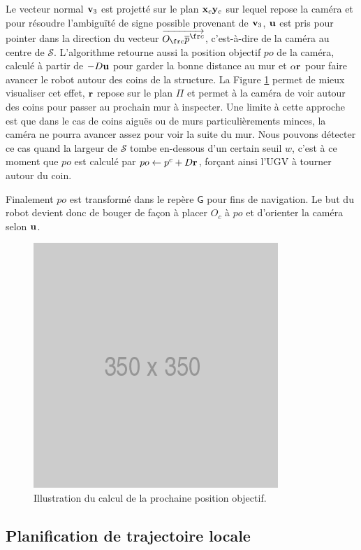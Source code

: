 Le vecteur normal $\mathbf{v}_3$ est projetté sur le plan $\mathbf{x}_c\mathbf{y}_c$ sur lequel repose la caméra et pour résoudre l'ambiguïté de signe possible provenant de $\mathbf{v}_3$, $\mathbf{u}$ est pris pour pointer dans la direction du vecteur $\overrightarrow{O_{\fr c} \overline{p}^{\fr c}}$, c'est-à-dire de la caméra au centre de $\mathcal{S}$. L'algorithme retourne aussi la position objectif ${po}$ de la caméra, calculé à partir de $-D\mathbf{u}$ pour garder la bonne distance au mur et $\alpha \mathbf{r}$ pour faire avancer le robot autour des coins de la structure. La Figure \ref{fig:ugv_goal_determination} permet de mieux visualiser cet effet, $\mathbf{r}$ repose sur le plan $\Pi$ et permet à la caméra de voir autour des coins pour passer au prochain mur à inspecter. Une limite à cette approche est que dans le cas de coins aiguës ou de murs particulièrements minces, la caméra ne pourra avancer assez pour voir la suite du mur. Nous pouvons détecter ce cas quand la largeur de $\mathcal{S}$ tombe en-dessous d'un certain seuil $w$, c'est à ce moment que ${po}$ est calculé par ${po} \gets p^c + D \mathbf{r}$, forçant ainsi l'UGV à tourner autour du coin.

Finalement ${po}$ est transformé dans le repère $\mathsf{G}$ pour fins de navigation. Le but du robot  devient donc de bouger de façon à placer $O_c$ à ${po}$ et d'orienter la caméra selon $\mathbf{u}$.

\begin{figure}[htp]
  \centering
  \includegraphics[width=0.3\linewidth]{images/placeholder.png}
  \caption{Illustration du calcul de la prochaine position objectif.}
  \label{fig:ugv_goal_determination}
\end{figure}

\subsection{Planification de trajectoire locale}


